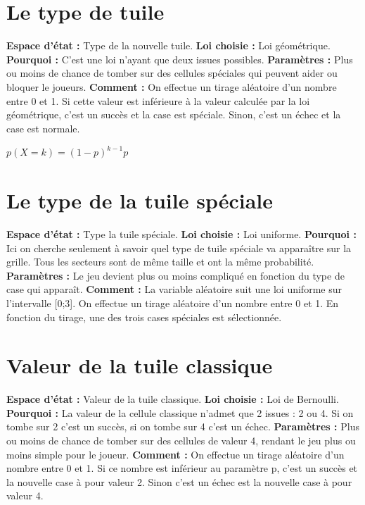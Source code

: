 \documentclass[a4paper, 12pt]{report}
\begin{document}
\begin{flushleft}

\section{Le type de tuile}

\textbf{Espace d'état :} Type de la nouvelle tuile.\break
\textbf{Loi choisie :} Loi géométrique.\break
\textbf{Pourquoi :} C’est une loi n’ayant que deux issues possibles.\break
\textbf{Paramètres :} Plus ou moins de chance de tomber sur des cellules spéciales qui peuvent aider ou bloquer le joueurs.\break
\textbf{Comment :} On effectue un tirage aléatoire d’un nombre entre 0 et 1. Si cette valeur est inférieure à la valeur calculée par la loi géométrique, c’est un succès et la case est spéciale. 
Sinon, c’est un échec et la case est normale.\break

\begin{center}
${p(X=k)=(1-p)^{k-1}p}$
\end{center}

\section{Le type de la tuile spéciale}

\textbf{Espace d'état :} Type la tuile spéciale.\break
\textbf{Loi choisie :} Loi uniforme.\break
\textbf{Pourquoi :} Ici on cherche seulement à savoir quel type de tuile spéciale va apparaître sur la grille. Tous les secteurs sont de même taille et ont la même probabilité.\break
\textbf{Paramètres :} Le jeu devient plus ou moins compliqué en fonction du type de case qui apparaît.\break
\textbf{Comment :} La variable aléatoire suit une loi uniforme sur l'intervalle [0;3]. On effectue un tirage aléatoire d’un nombre entre 0 et 1. En fonction du tirage, une des trois cases spéciales est sélectionnée.\break

\section{Valeur de la tuile classique}

\textbf{Espace d'état :} Valeur de la tuile classique.\break
\textbf{Loi choisie :} Loi de Bernoulli.\break
\textbf{Pourquoi :} La valeur de la cellule classique n’admet que 2 issues : 2 ou 4. Si on tombe sur 2 c’est un succès, si on tombe sur 4 c’est un échec.\break
\textbf{Paramètres :} Plus ou moins de chance de tomber sur des cellules de valeur 4, rendant le jeu plus ou moins simple pour le joueur.\break
\textbf{Comment :} On effectue un tirage aléatoire d’un nombre entre 0 et 1.  Si ce nombre est inférieur au paramètre p, c’est un succès et la nouvelle case à pour valeur 2. 
Sinon c’est un échec est la nouvelle case à pour valeur 4.\break


\end{flushleft}
\end{document}
